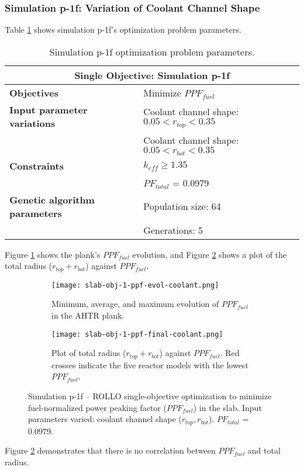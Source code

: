 \subsubsection{Simulation p-1f: Variation of Coolant Channel Shape}
Table \ref{tab:simulationp1f} shows simulation p-1f's optimization problem parameters. 
\begin{table}[htbp!]
    \centering
    \onehalfspacing
    \caption{Simulation p-1f optimization problem parameters.}
	\label{tab:simulationp1f}
    \footnotesize
    \begin{tabular}{l|p{6.5cm}}
    \hline 
    \multicolumn{2}{c}{\textbf{Single Objective: Simulation p-1f}} \\
    \hline 
    \textbf{Objectives} & Minimize $PPF_{fuel}$ \\
    \hline 
    \textbf{Input parameter variations} 
    & Coolant channel shape: $0.05<r_{top}<0.35$ \\
    & Coolant channel shape: $0.05<r_{bot}<0.35$ \\
    \hline
    \textbf{Constraints} & $k_{eff} \geq 1.35$\\ 
    & $PF_{total}$ = 0.0979\\
    \hline 
    \textbf{Genetic algorithm parameters} & Population size: 64 \\
    & Generations: 5 \\
    \hline
    \end{tabular}
\end{table}

Figure \ref{fig:slab-obj-1-ppf-evol-coolant} shows the plank's $PPF_{fuel}$ evolution, 
and Figure \ref{fig:slab-obj-1-ppf-final-coolant} shows a plot of the total 
radius ($r_{top} + r_{bot}$) against $PPF_{fuel}$. 
\begin{figure}[htbp!]
    \centering
    \begin{subfigure}{\textwidth}
        \texttt{[image: slab-obj-1-ppf-evol-coolant.png]}
        \caption{Minimum, average, and maximum evolution of $PPF_{fuel}$ in the 
        AHTR plank.}
        \label{fig:slab-obj-1-ppf-evol-coolant} 
    \end{subfigure}
    \begin{subfigure}{\textwidth}
        \texttt{[image: slab-obj-1-ppf-final-coolant.png]}
        \caption{Plot of total radius ($r_{top} + r_{bot}$) against $PPF_{fuel}$. 
        Red crosses indicate the five reactor models with the lowest $PPF_{fuel}$.}
        \label{fig:slab-obj-1-ppf-final-coolant} 
    \end{subfigure}
    \caption{Simulation p-1f -- ROLLO single-objective optimization to minimize 
    fuel-normalized power peaking factor ($PPF_{fuel}$) in the slab. 
    Input parameters varied: coolant channel shape ($r_{top}, r_{bot}$). 
    $PF_{total}$ = 0.0979.}
    \label{fig:slab-obj-1-ppf-coolant}
\end{figure}
Figure \ref{fig:slab-obj-1-ppf-final-coolant} demonstrates that there is no correlation 
between $PPF_{fuel}$ and total radius. 


